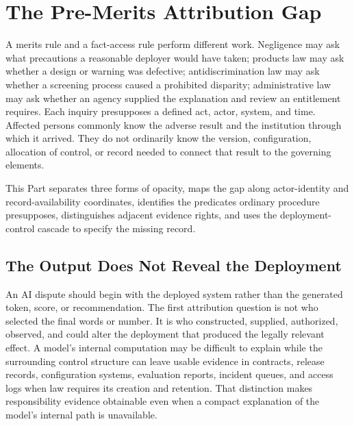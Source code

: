 \section{The Pre-Merits Attribution Gap}
\label{sec:gap}

A merits rule and a fact-access rule perform different work. Negligence may ask what precautions a reasonable deployer would have taken; products law may ask whether a design or warning was defective; antidiscrimination law may ask whether a screening process caused a prohibited disparity; administrative law may ask whether an agency supplied the explanation and review an entitlement requires. Each inquiry presupposes a defined act, actor, system, and time. Affected persons commonly know the adverse result and the institution through which it arrived. They do not ordinarily know the version, configuration, allocation of control, or record needed to connect that result to the governing elements.

This Part separates three forms of opacity, maps the gap along actor-identity and record-availability coordinates, identifies the predicates ordinary procedure presupposes, distinguishes adjacent evidence rights, and uses the deployment-control cascade to specify the missing record.

\subsection{The Output Does Not Reveal the Deployment}

An AI dispute should begin with the deployed system rather than the generated token, score, or recommendation. The first attribution question is not who selected the final words or number. It is who constructed, supplied, authorized, observed, and could alter the deployment that produced the legally relevant effect. A model's internal computation may be difficult to explain while the surrounding control structure can leave usable evidence in contracts, release records, configuration systems, evaluation reports, incident queues, and access logs when law requires its creation and retention. That distinction makes responsibility evidence obtainable even when a compact explanation of the model's internal path is unavailable.

